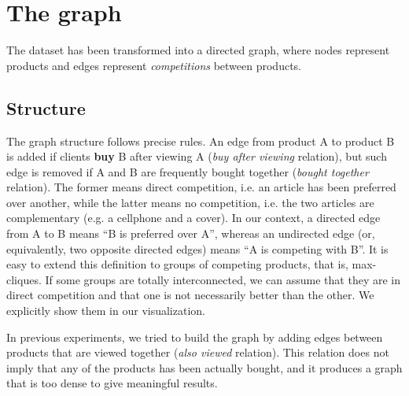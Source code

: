 \documentclass[a4paper,12pt]{article}
\begin{document}
\section{The graph}
\label{sec:graph}
The dataset has been transformed into a directed graph, where nodes represent products and edges represent \textit{competitions} between products. 
\subsection{Structure}
The graph structure follows precise rules. An edge from product A to product B is added if clients \textbf{buy} B after viewing A (\textit{buy after viewing} relation), but such edge is removed if A and B are frequently bought together (\textit{bought together} relation). The former means direct competition, i.e. an article has been preferred over another, while the latter means no competition, i.e. the two articles are complementary (e.g. a cellphone and a cover). In our context, a directed edge from A to B means ``B is preferred over A'', whereas an undirected edge (or, equivalently, two opposite directed edges) means ``A is competing with B''. It is easy to extend this definition to groups of competing products, that is, max-cliques. If some groups are totally interconnected, we can assume that they are in direct competition and that one is not necessarily better than the other. We explicitly show them in our visualization.

In previous experiments, we tried to build the graph by adding edges between products that are viewed together (\textit{also viewed} relation). This relation does not imply that any of the products has been actually bought, and it produces a graph that is too dense to give meaningful results.
\end{document}
